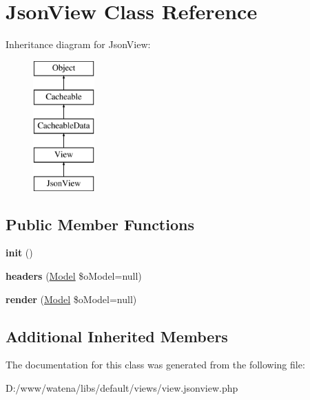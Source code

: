 \hypertarget{class_json_view}{\section{Json\-View Class Reference}
\label{class_json_view}
}
Inheritance diagram for Json\-View\-:\begin{figure}[H]
\begin{center}
\leavevmode
\includegraphics[height=5.000000cm]{class_json_view}
\end{center}
\end{figure}
\subsection*{Public Member Functions}
\begin{DoxyCompactItemize}
\item 
\hypertarget{class_json_view_a518a2e943c598047f39678cf0dfcecbe}{{\bfseries init} ()}\label{class_json_view_a518a2e943c598047f39678cf0dfcecbe}

\item 
\hypertarget{class_json_view_afef7df487aade99f8d8f2b878205967e}{{\bfseries headers} (\hyperlink{class_model}{Model} \$o\-Model=null)}\label{class_json_view_afef7df487aade99f8d8f2b878205967e}

\item 
\hypertarget{class_json_view_adfc6caf445b0929810fd167cd3cb9c30}{{\bfseries render} (\hyperlink{class_model}{Model} \$o\-Model=null)}\label{class_json_view_adfc6caf445b0929810fd167cd3cb9c30}

\end{DoxyCompactItemize}
\subsection*{Additional Inherited Members}


The documentation for this class was generated from the following file\-:\begin{DoxyCompactItemize}
\item 
D\-:/www/watena/libs/default/views/view.\-jsonview.\-php\end{DoxyCompactItemize}
